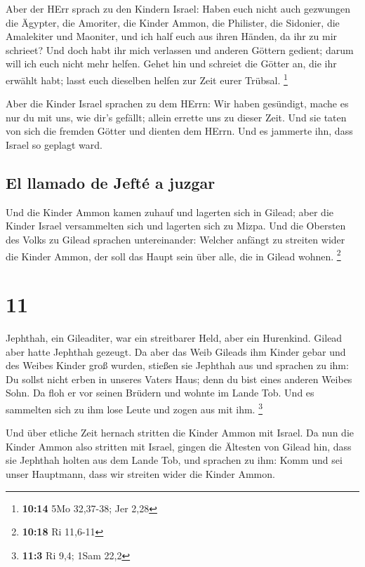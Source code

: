  Aber der HErr sprach zu den Kindern Israel: Haben euch
nicht auch gezwungen die Ägypter, die Amoriter, die Kinder Ammon, die
Philister,  die Sidonier, die Amalekiter und Maoniter,
und ich half euch aus ihren Händen, da ihr zu mir schrieet?
 Und doch habt ihr mich verlassen und anderen Göttern
gedient; darum will ich euch nicht mehr helfen.  Gehet
hin und schreiet die Götter an, die ihr erwählt habt; lasst euch
dieselben helfen zur Zeit eurer Trübsal. \footnote{\textbf{10:14} 5Mo
  32,37-38; Jer 2,28}

 Aber die Kinder Israel sprachen zu dem HErrn: Wir haben
gesündigt, mache es nur du mit uns, wie dir's gefällt; allein errette
uns zu dieser Zeit.  Und sie taten von sich die fremden
Götter und dienten dem HErrn. Und es jammerte ihn, dass Israel so
geplagt ward.

\hypertarget{el-llamado-de-jeftuxe9-a-juzgar}{%
\subsection{El llamado de Jefté a
juzgar}\label{el-llamado-de-jeftuxe9-a-juzgar}}

 Und die Kinder Ammon kamen zuhauf und lagerten sich in
Gilead; aber die Kinder Israel versammelten sich und lagerten sich zu
Mizpa.  Und die Obersten des Volks zu Gilead sprachen
untereinander: Welcher anfängt zu streiten wider die Kinder Ammon, der
soll das Haupt sein über alle, die in Gilead wohnen. \footnote{\textbf{10:18}
  Ri 11,6-11}

\hypertarget{section-10}{%
\section{11}\label{section-10}}

 Jephthah, ein Gileaditer, war ein streitbarer Held, aber
ein Hurenkind. Gilead aber hatte Jephthah gezeugt.  Da
aber das Weib Gileads ihm Kinder gebar und des Weibes Kinder groß
wurden, stießen sie Jephthah aus und sprachen zu ihm: Du sollst nicht
erben in unseres Vaters Haus; denn du bist eines anderen Weibes Sohn.
 Da floh er vor seinen Brüdern und wohnte im Lande Tob.
Und es sammelten sich zu ihm lose Leute und zogen aus mit ihm.
\footnote{\textbf{11:3} Ri 9,4; 1Sam 22,2}

 Und über etliche Zeit hernach stritten die Kinder Ammon
mit Israel.  Da nun die Kinder Ammon also stritten mit
Israel, gingen die Ältesten von Gilead hin, dass sie Jephthah holten aus
dem Lande Tob,  und sprachen zu ihm: Komm und sei unser
Hauptmann, dass wir streiten wider die Kinder Ammon.


